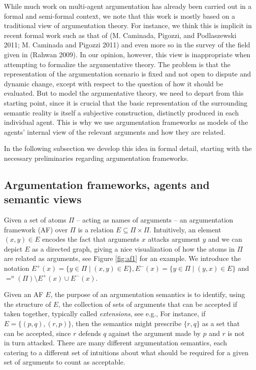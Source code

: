 \documentclass{article}
\newcommand{\outa}[2]{#1^+(#2)}
\newcommand{\ina}[2]{#1^-(#2)}
\newcommand{\neu}[2]{#1^n(#2)}
\begin{document}
While much work on multi-agent argumentation has already been carried out in a formal and semi-formal context, we note that this work is mostly based on a traditional view of argumentation theory. For instance, we think this is implicit in recent formal work such as that of  (M. Caminada, Pigozzi, and Podlaszewski 2011; M. Caminada and Pigozzi 2011) and even more so in the survey of the field given in (Rahwan 2009). In our opinion, however, this view is inappropriate when attempting to formalize the argumentative theory.
The problem is that the representation of the argumentation scenario is fixed and not open to dispute and dynamic change, except with respect to the question of how it should be evaluated. But to model the argumentative theory, we need to depart from this starting point, since it is crucial that the basic representation of the surrounding semantic reality is itself a subjective construction, distinctly produced in each individual agent. This is why we use argumentation frameworks as models of the agents' internal view of the relevant arguments and how they are related.

In the following subsection we develop this idea in formal detail, starting with the necessary preliminaries regarding argumentation frameworks.

\subsection{Argumentation frameworks, agents and semantic views}\label{subsec:arg}

Given a set of atoms $\Pi$ -- acting as names of arguments -- an argumentation framework (AF) over $\Pi$ is a relation $E \subseteq \Pi \times \Pi$. Intuitively, an element $(x,y) \in E$ encodes the fact that arguments $x$ attacks argument $y$ and we can depict $E$ as a directed graph, giving a nice visualization of how the atoms in $\Pi$ are related as arguments, see Figure \ref{fig:af1} for an example. We introduce the notation $\outa E x = \{y \in \Pi \mid (x,y) \in E\}, \ina E x = \{y \in \Pi \mid (y,x) \in E\}$ and $\neu = \Pi \setminus \outa E x \cup \ina E x$.

Given an AF $E$, the purpose of an argumentation semantics is to identify, using the structure of $E$, the collection of sets of arguments that can be accepted if taken together, typically called \emph{extensions}, see e.g., \cite{....} For instance, if $E = \{(p,q),(r,p)\}$, then the semantics might prescribe $\{r,q\}$ as a set that can be accepted, since $r$ defends $q$ against the argument made by $p$ and $r$ is not in turn attacked. There are many different argumentation semantics, each catering to a different set of intuitions about what should be required for a given set of arguments to count as acceptable.
\end{document}

